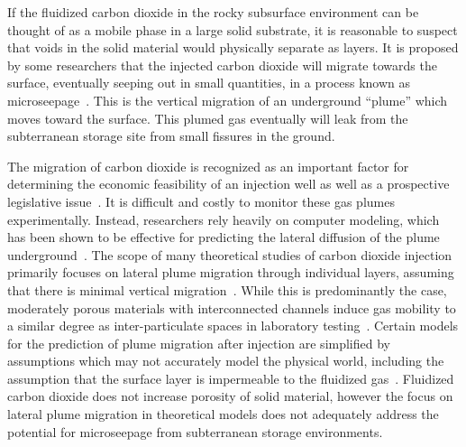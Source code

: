 \documentclass[journal]{IEEEtran}
\begin{document}
If the fluidized carbon dioxide in the rocky subsurface environment can be thought of as a mobile phase in a large solid substrate, it is reasonable to suspect that voids in the solid material would physically separate as layers.  It is proposed by some researchers that the injected carbon dioxide will migrate towards the surface, eventually seeping out in small quantities, in a process known as microseepage~\cite{klusman_baseline_2005, klusman_rate_2003, carrroll_geochemical_2009}.  This is the vertical migration of an underground ``plume'' which moves toward the surface.  This plumed gas eventually will leak from the subterranean storage site from small fissures in the ground.  


The migration of carbon dioxide is recognized as an important factor for determining the economic feasibility of an injection well as well as a prospective legislative issue~\cite{vandeweijer_monitoring_2011}.  It is difficult and costly to monitor these gas plumes experimentally.  Instead, researchers rely heavily on computer modeling, which has been shown to be effective for predicting the lateral diffusion of the plume underground~\cite{oldenburg_process_2001,zhang_gas_2016}.  The scope of many theoretical studies of carbon dioxide injection primarily focuses on lateral plume migration through individual layers, assuming that there is minimal vertical migration~\cite{singh_numerical_2012}.  While this is predominantly the case, moderately porous materials with interconnected channels induce gas mobility to a similar degree as inter-particulate spaces in laboratory testing~\cite{honari_enhanced_2015}.  Certain models for the prediction of plume migration after injection are simplified by assumptions which may not accurately model the physical world, including the assumption that the surface layer is impermeable to the fluidized gas~\cite{patel_high-fidelity_2016}.   Fluidized carbon dioxide does not increase porosity of solid material, however the focus on lateral plume migration in theoretical models does not adequately address the potential for microseepage from subterranean storage environments.
\end{document}
